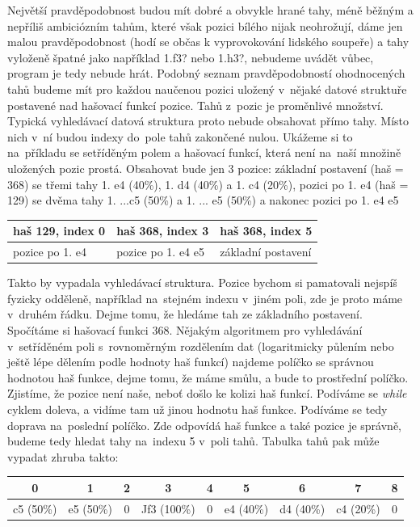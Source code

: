 \documentclass[11pt, titlepage]{article}
\begin{document}
Největší pravděpodobnost budou mít dobré a obvykle hrané tahy, méně běžným a nepříliš ambiciózním tahům, které však pozici bílého nijak neohrožují, dáme jen malou pravděpodobnost (hodí se občas k vyprovokování lidského soupeře) a tahy vyloženě špatné jako například 1.f3? nebo 1.h3?, nebudeme uvádět vůbec, program je tedy nebude hrát.
Podobný seznam pravděpodobností ohodnocených tahů budeme mít pro každou naučenou pozici uložený v~nějaké datové struktuře postavené nad hašovací funkcí pozice. Tahů z~pozic je proměnlivé množství. Typická vyhledávací datová struktura proto nebude obsahovat přímo tahy. Místo nich v~ní budou indexy do~pole tahů zakončené nulou. Ukážeme si to na~příkladu se setříděným polem a hašovací funkcí, která není na~naší množině uložených pozic prostá. Obsahovat bude jen 3 pozice: základní postavení (haš = 368) se třemi tahy 1. e4 (40\%), 1. d4 (40\%) a 1. c4 (20\%), pozici po 1. e4 (haš = 129) se dvěma tahy 1. ...c5 (50\%) a 1. ... e5 (50\%) a nakonec pozici po 1. e4 e5

\vskip 0.5cm
\noindent
\begin{tabular}{|l|l|l|}
\hline
haš 129, index 0 & haš 368, index 3 & haš 368, index 5 \\
\hline
pozice po 1. e4 & pozice po 1. e4 e5 & základní postavení \\
\hline
\end{tabular}
\vskip 0.5cm

Takto by vypadala vyhledávací struktura. Pozice bychom si pamatovali nejspíš fyzicky odděleně, například na~stejném indexu v~jiném poli, zde je proto máme v~druhém řádku. Dejme tomu, že hledáme tah ze základního postavení. Spočítáme si hašovací funkci 368. Nějakým algoritmem pro vyhledávání v~setříděném poli s~rovnoměrným rozdělením dat (logaritmicky půlením nebo ještě lépe dělením podle hodnoty haš funkcí) najdeme políčko se správnou hodnotou haš funkce, dejme tomu, že máme smůlu, a bude to prostřední políčko. Zjistíme, že pozice není naše, neboť došlo ke kolizi haš funkcí. Podíváme se {\it while} cyklem doleva, a vidíme tam už jinou hodnotu haš funkce. Podíváme se tedy doprava na~poslední políčko. Zde odpovídá haš funkce a také pozice je správně, budeme tedy hledat tahy na~indexu 5 v~poli tahů. Tabulka tahů pak může vypadat zhruba takto:

\vskip 0.5cm
\noindent
\begin{tabular}{|c|c|c|c|c|c|c|c|c|}
\hline
0 & 1 & 2 & 3 & 4 & 5 & 6 & 7 & 8 \\
\hline
c5 (50\%) & e5 (50\%) & 0 & Jf3 (100\%) & 0 & e4 (40\%) & d4 (40\%) & c4 (20\%) & 0 \\
\hline
\end{tabular}
\vskip 0.5cm
\end{document}
